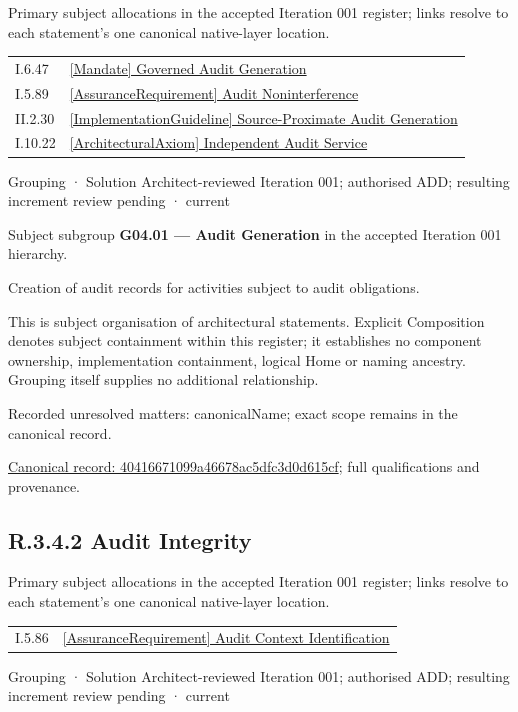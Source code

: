 Primary subject allocations in the accepted Iteration 001 register; links resolve to each statement’s one canonical native-layer location.\par
\begin{longtable}{p{.22\linewidth}p{.73\linewidth}}
I.6.47 & \hyperref[element:d388ee6fb1d24ca886b2802cfb42c30e]{[Mandate] Governed Audit Generation} \\
I.5.89 & \hyperref[element:ccea3a4dbd494cbe99c525ff2e87db26]{[AssuranceRequirement] Audit Noninterference} \\
II.2.30 & \hyperref[element:427d41b9416943d4a362470a965baea5]{[ImplementationGuideline] Source-Proximate Audit Generation} \\
I.10.22 & \hyperref[element:41fa01556ade4f22a35288b072113767]{[ArchitecturalAxiom] Independent Audit Service} \\
\end{longtable}
\label{element:40416671099a46678ac5dfc3d0d615cf}
{\small Grouping · Solution Architect-reviewed Iteration 001; authorised ADD; resulting increment review pending · current}\par

Subject subgroup \textbf{G04.01 — Audit Generation} in the accepted Iteration 001 hierarchy.



Creation of audit records for activities subject to audit obligations.



This is subject organisation of architectural statements. Explicit Composition denotes subject containment within this register; it establishes no component ownership, implementation containment, logical Home or naming ancestry. Grouping itself supplies no additional relationship.


{\small Recorded unresolved matters: canonicalName; exact scope remains in the canonical record.}\par
{\footnotesize \href{../../../../continuum/grouping/40416671099a46678ac5dfc3d0d615cf.md}{Canonical record: 40416671099a46678ac5dfc3d0d615cf}; full qualifications and provenance.}\par
\subsection*{R.3.4.2 Audit Integrity}
\label{navigation:R.3.4.2}

Primary subject allocations in the accepted Iteration 001 register; links resolve to each statement’s one canonical native-layer location.\par
\begin{longtable}{p{.22\linewidth}p{.73\linewidth}}
I.5.86 & \hyperref[element:de466c998be34fae87a2be41983cbcdd]{[AssuranceRequirement] Audit Context Identification} \\
\end{longtable}
\label{element:c102ede2b9e249b2a2ddc9f19e0cbd7f}
{\small Grouping · Solution Architect-reviewed Iteration 001; authorised ADD; resulting increment review pending · current}\par

